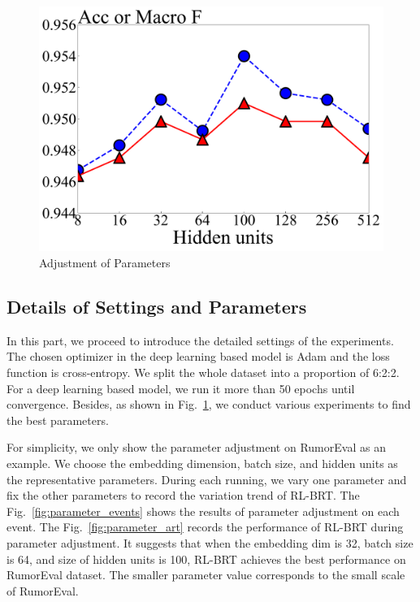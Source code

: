 \begin{figure}[tbp]
{\begin{minipage}[b]{0.35\linewidth}
			\includegraphics[width=1\linewidth]{fig/hidden_units}
		\end{minipage}
	}
	\caption{Adjustment of Parameters}
	\label{fig:parameter}
\end{figure}

\subsection{Details of Settings and Parameters}
In this part, we proceed to introduce the detailed settings of the experiments. The chosen optimizer in the deep learning based model is Adam and the loss function is cross-entropy. We split the whole dataset into a proportion of 6:2:2. For a deep learning based model, we run it more than 50 epochs until convergence. Besides, as shown in Fig.~\ref{fig:parameter}, we conduct various experiments to find the best parameters.

For simplicity, we only show the parameter adjustment on RumorEval as an example. We choose the embedding dimension, batch size, and hidden units as the representative parameters. During each running, we vary one parameter and fix the other parameters to record the variation trend of RL-BRT. The Fig.~\ref{fig:parameter_events} shows the results of parameter adjustment on each event. The Fig.~\ref{fig:parameter_art} records the performance of RL-BRT during parameter adjustment. It suggests that when the embedding dim is 32, batch size is 64, and size of hidden units is 100, RL-BRT achieves the best performance on RumorEval dataset. The smaller parameter value corresponds to the small scale of RumorEval.

